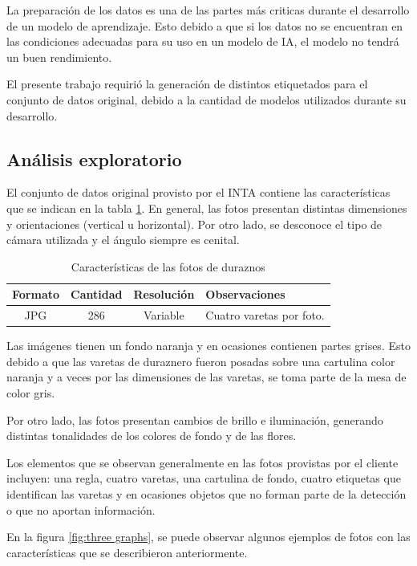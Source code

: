La preparación de los datos es una de las partes más criticas durante el desarrollo de un modelo de aprendizaje. Esto debido a que si los datos no se encuentran en las condiciones adecuadas para su uso en un modelo de IA, el modelo no tendrá un buen rendimiento. 

El presente trabajo requirió la generación de distintos etiquetados para el conjunto de datos original, debido a la cantidad de modelos utilizados durante su desarrollo.

\subsection{Análisis exploratorio}
El conjunto de datos original provisto por el INTA contiene las características que se indican en la tabla \ref{tab:flores}. En general, las fotos presentan distintas dimensiones y orientaciones (vertical u horizontal). Por otro lado, se desconoce el tipo de cámara utilizada y el ángulo siempre es cenital.


\begin{table}[h]
	\centering
	\caption{Características de las fotos de duraznos}
	\begin{tabular}{c c c l}    
		\toprule
		\textbf{Formato}     & \textbf{Cantidad} & \textbf{Resolución} & \textbf{Observaciones}\\
		\midrule
		JPG                  & 286               &  Variable &  Cuatro varetas por foto.\\		
		\bottomrule
		\hline
	\end{tabular}
	\label{tab:flores}
\end{table}
 
Las imágenes tienen un fondo naranja y en ocasiones contienen partes grises. Esto debido a que las varetas de duraznero fueron posadas sobre una cartulina color naranja y a veces por las dimensiones de las varetas, se toma parte de la mesa de color gris.

Por otro lado, las fotos presentan cambios de brillo e iluminación, generando distintas tonalidades de los colores de fondo y de las flores. 

Los elementos que se observan generalmente en las fotos provistas por el cliente incluyen: una regla, cuatro varetas, una cartulina de fondo, cuatro etiquetas que identifican las varetas y en ocasiones objetos que no forman parte de la detección o que no aportan información.

En la figura \ref{fig:three graphs}, se puede observar algunos ejemplos de fotos con las características que se describieron anteriormente.

